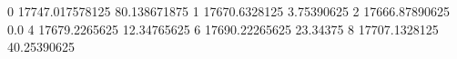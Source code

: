 0 17747.017578125 80.138671875
1 17670.6328125 3.75390625
2 17666.87890625 0.0
4 17679.2265625 12.34765625
6 17690.22265625 23.34375
8 17707.1328125 40.25390625
